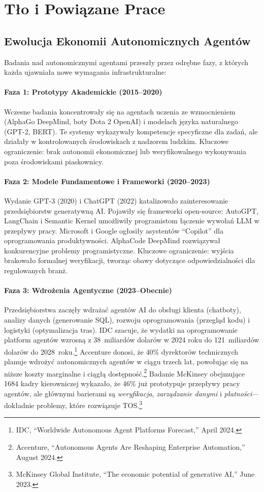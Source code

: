 \documentclass[11pt]{article}
\begin{document}
\section{Tło i Powiązane Prace}
\subsection{Ewolucja Ekonomii Autonomicznych Agentów}
Badania nad autonomicznymi agentami przeszły przez odrębne fazy, z których każda ujawniała nowe wymagania infrastrukturalne:

\paragraph{Faza 1: Prototypy Akademickie (2015--2020)} Wczesne badania koncentrowały się na agentach uczenia ze wzmocnieniem (AlphaGo DeepMind, boty Dota 2 OpenAI) i modelach języka naturalnego (GPT-2, BERT). Te systemy wykazywały kompetencje specyficzne dla zadań, ale działały w kontrolowanych środowiskach z nadzorem ludzkim. Kluczowe ograniczenie: brak autonomii ekonomicznej lub weryfikowalnego wykonywania poza środowiskami piaskownicy.

\paragraph{Faza 2: Modele Fundamentowe i Frameworki (2020--2023)} Wydanie GPT-3 (2020) i ChatGPT (2022) katalizowało zainteresowanie przedsiębiorstw generatywną AI. Pojawiły się frameworki open-source: AutoGPT, LangChain i Semantic Kernel umożliwiły programistom łączenie wywołań LLM w przepływy pracy. Microsoft i Google ogłosiły asystentów ``Copilot'' dla oprogramowania produktywności. AlphaCode DeepMind rozwiązywał konkurencyjne problemy programistyczne. Kluczowe ograniczenie: wyjścia brakowało formalnej weryfikacji, tworząc obawy dotyczące odpowiedzialności dla regulowanych branż.

\paragraph{Faza 3: Wdrożenia Agentyczne (2023--Obecnie)} Przedsiębiorstwa zaczęły wdrażać agentów AI do obsługi klienta (chatboty), analizy danych (generowanie SQL), rozwoju oprogramowania (przegląd kodu) i logistyki (optymalizacja tras). IDC szacuje, że wydatki na oprogramowanie platform agentów wzrosną z 38~miliardów dolarów w 2024 roku do 121~miliardów dolarów do 2028~roku.\footnote{IDC, ``Worldwide Autonomous Agent Platforms Forecast,'' April 2024.} Accenture donosi, że 40\% dyrektorów technicznych planuje wdrożyć autonomicznych agentów w ciągu trzech lat, powołując się na niższe koszty marginalne i ciągłą dostępność.\footnote{Accenture, ``Autonomous Agents Are Reshaping Enterprise Automation,'' August 2024.} Badanie McKinsey obejmujące 1684 kadry kierowniczej wykazało, że 46\% już prototypuje przepływy pracy agentów, ale głównymi barierami są \emph{weryfikacja}, \emph{zarządzanie danymi} i \emph{płatności}---dokładnie problemy, które rozwiązuje TOS.\footnote{McKinsey Global Institute, ``The economic potential of generative AI,'' June 2023.}
\end{document}
